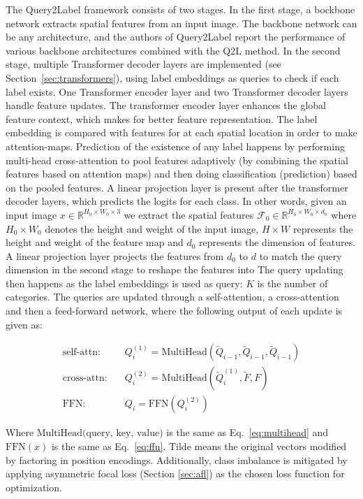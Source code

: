 \documentclass[lettersize,journal]{IEEEtran}
\begin{document}
The Query2Label framework consists of two stages. In the first stage, a bockbone network extracts spatial features from an input image. The backbone network can be any architecture, and the authors of Query2Label report the performance of various backbone architectures combined with the Q2L method. In the second stage, multiple Transformer decoder layers are implemented (see Section~\ref{sec:transformers}), using label embeddings as queries to check if each label exists. One Transformer encoder layer and two Transformer decoder layers handle feature updates. The transformer encoder layer enhances the global feature context, which makes for better feature representation. The label embedding is compared with features for at each spatial location in order to make attention-maps. Prediction of the existence of any label happens by performing multi-head cross-attention to pool features adaptively (by combining the spatial features based on attention maps) and then doing classification (prediction) based on the pooled features. A linear projection layer is present after the transformer decoder layers, which predicts the logits for each class. In other words, given an input image $x\in \mathbb{R}^{H_0\times W_0\times 3}$ we extract the spatial features $\mathcal{F}_0\in \mathbb{R}^{H_0\times W_0\times d_0}$ where $H_0 \times W_0$ denotes the height and weight of the input image, $H \times W$ represents the height and weight of the feature map and $d_0$ represents the dimension of features. A linear projection layer projects the features from $d_0$ to $d$ to match the query dimension in the second stage to reshape the features into 
The query updating then happens as the label embeddings is used as query: 
$K$ is the number of categories. The queries are updated through a self-attention, a cross-attention and then a feed-forward network, where the following output of each update is given as:

\begin{equation}
    \begin{aligned}
    \text{self-attn:} \quad & Q^{(1)}_i = \text{MultiHead}(\tilde{Q}_{i-1}, \tilde{Q}_{i-1}, \tilde{Q}_{i-1}) \\
    \text{cross-attn:} \quad & Q^{(2)}_i = \text{MultiHead}(\tilde{Q}^{(1)}_i, \tilde{F}, F) \\
    \text{FFN:} \quad & Q_i = \text{FFN}(Q^{(2)}_i)
    \end{aligned}
\end{equation}

Where $\text{MultiHead(query, key, value)}$ is the same as Eq.~\ref{eq:multihead} and $\text{FFN}(x)$ is the same as Eq.~\ref{eq:ffn}. Tilde means the original vectors modified by factoring in position encodings. Additionally, class imbalance is mitigated by applying asymmetric focal loss (Section \ref{sec:afl}) as the chosen loss function for optimization.
\end{document}
